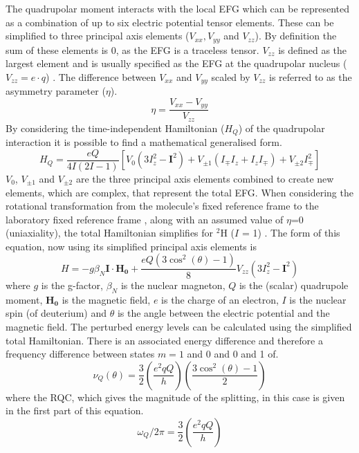 The quadrupolar moment interacts with the local \ac{EFG} which can be represented as a combination of up to six electric potential tensor elements. These can be simplified to three principal axis elements ($V_{xx}, V_{yy}$ and $V_{zz}$). By definition the sum of these elements is 0, as the \ac{EFG} is a traceless tensor. $V_{zz}$ is defined as the largest element and is usually specified as the \ac{EFG} at the quadrupolar nucleus ($V_{zz} = e\cdot q$) \cite{Elliott2021WhatMedia}. The difference between $V_{xx}$ and $V_{yy}$ scaled by $V_{zz}$ is referred to as the asymmetry parameter ($\eta$).
\begin{equation}
    \eta = \frac{V_{xx}-V_{yy}}{V_{zz}}
\end{equation}
By considering the time-independent Hamiltonian ($H_Q$) of the quadrupolar interaction it is possible to find a mathematical generalised form.
\begin{equation}
    H_Q = \frac{eQ}{4I(2I-1)}[V_0(3I^2_z-\boldsymbol{I}^2) + V_{\pm1}(I_{\mp}I_z+I_zI_\mp)+V_{\pm2}I^2_\mp]
\end{equation}
$V_0$, $V_{\pm1}$ and $V_{\pm2}$ are the three principal axis elements combined to create new elements, which are complex, that represent the total \ac{EFG}. When considering the rotational transformation from the molecule's fixed reference frame to the laboratory fixed reference frame \cite{Seelig1977DeuteriumMembranes}, along with an assumed value of $\eta$=0 (uniaxiality), the total Hamiltonian simplifies for $^2$H ($I$ = 1)  \cite{Sharf1995DetectionNMR-Spectroscopy}. The form of this equation, now using its simplified principal axis elements is
\begin{equation}
    H = -g\beta_N\boldsymbol{I}\cdot\boldsymbol{H_0} + \frac{eQ(3\cos^2(\theta)-1)}{8}V_{zz}(3I_z^2-\boldsymbol{I}^2)
\end{equation}
where $g$ is the g-factor, $\beta_N$ is the nuclear magneton, $Q$ is the (scalar) quadrupole moment, $\boldsymbol{H_0}$ is the magnetic field, $e$ is the charge of an electron, $I$ is the nuclear spin (of deuterium) and $\theta$ is the angle between the electric potential and the magnetic field. The perturbed energy levels can be calculated using the simplified total Hamiltonian. There is an associated energy difference and therefore a frequency difference between states $m=1$ and 0 and 0 and 1 of.
\begin{equation}
    \nu_Q(\theta) = \frac{3}{2}\left(\frac{e^2qQ}{h}\right)\left(\frac{3\cos^2(\theta)-1}{2}\right)
    \label{eqn:Quad:Angle}
\end{equation}
where the \ac{RQC}, which gives the magnitude of the splitting, in this case is given in the first part of this equation.
\begin{equation}
    \omega_Q/2\pi = \frac{3}{2}\left(\frac{e^2qQ}{h}\right)
    \label{eqn:Quad:RQC}
\end{equation}

